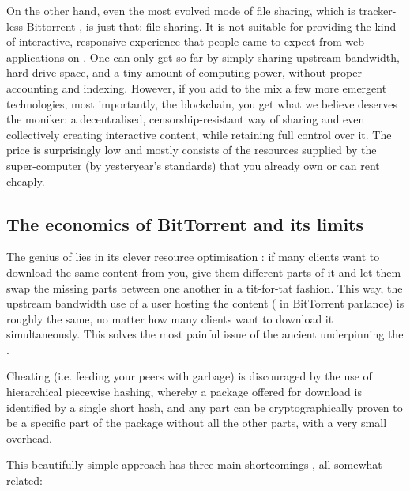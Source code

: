 On the other hand, even the most evolved mode of  file sharing, which is tracker-less Bittorrent \cite{pouwelse2005bittorrent}, is just that: file sharing. It is not suitable for providing the kind of interactive, responsive experience that people came to expect from web applications on . One can only get so far by simply sharing upstream bandwidth, hard-drive space, and a tiny amount of computing power, without proper accounting and indexing. However, if you add to the mix a few more emergent technologies, most importantly, the blockchain, you get what we believe deserves the  moniker: a decentralised, censorship-resistant way of sharing and even collectively creating interactive content, while retaining full control over it. The price is surprisingly low and mostly consists of the resources supplied by the super-computer (by yesteryear's standards) that you already own or can rent cheaply.

\subsection{The economics of BitTorrent and its limits \statusgreen}

The genius of  lies in its clever resource optimisation \cite{cohen2003incentives}: if many clients want to download the same content from you, give them different parts of it and let them swap the missing parts between one another in a tit-for-tat fashion. This way, the upstream bandwidth use of a user hosting the content ( in BitTorrent parlance) is roughly the same, no matter how many clients want to download it simultaneously. This solves the most painful issue of the ancient  underpinning the .

Cheating (i.e. feeding your peers with garbage) is discouraged by the use of hierarchical piecewise hashing, whereby a package offered for download is identified by a single short hash, and any part can be cryptographically proven to be a specific part of the package without all the other parts, with a very small overhead. 

This beautifully simple approach has three main shortcomings \cite{locher2006free,piatek2007incentives}, all somewhat related:


